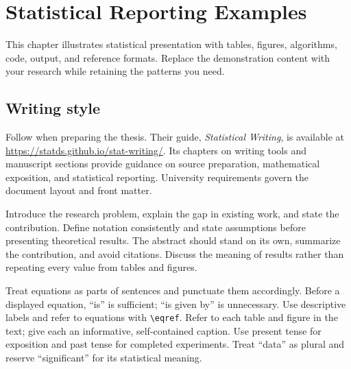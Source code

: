 \chapter{Statistical Reporting Examples}
\label{chap:presentation}
This chapter illustrates statistical presentation with tables, figures,
algorithms, code, output, and reference formats. Replace the demonstration
content with your research while retaining the patterns you need.


\section{Writing style}
Follow \citet{schifano2026statistical} when preparing the thesis. Their guide,
\emph{Statistical Writing}, is available at
\url{https://statds.github.io/stat-writing/}. Its chapters on writing tools and
manuscript sections provide guidance on source preparation, mathematical
exposition, and statistical reporting. University requirements govern the
document layout and front matter.


Introduce the research problem, explain the gap in existing work, and state the
contribution. Define notation consistently and state assumptions before
presenting theoretical results. The abstract should stand on its own, summarize
the contribution, and avoid citations. Discuss the meaning of results rather
than repeating every value from tables and figures.


Treat equations as parts of sentences and punctuate them accordingly. Before
a displayed equation, ``is'' is sufficient; ``is given by'' is unnecessary. Use
descriptive labels and refer to equations with \verb|\eqref|. Refer to each
table and figure in the text; give each an informative, self-contained caption.
Use present tense for exposition and past tense for completed experiments.
Treat ``data'' as plural and reserve ``significant'' for its statistical
meaning.


